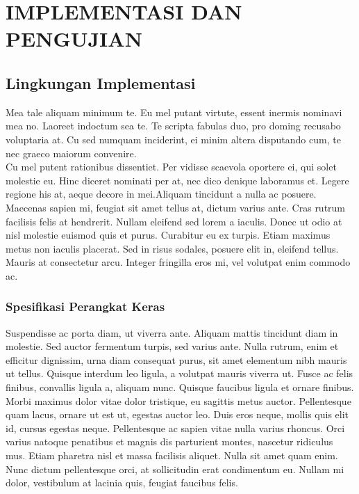 \chapter{IMPLEMENTASI DAN PENGUJIAN}

\vspace{4.5pt}

\section{Lingkungan Implementasi}
Mea tale aliquam minimum te. Eu mel putant virtute, essent inermis nominavi mea no. Laoreet indoctum sea te. Te scripta fabulas duo, pro doming recusabo voluptaria at. Cu sed numquam inciderint, ei minim altera disputando cum, te nec graeco maiorum convenire.\\
Cu mel putent rationibus dissentiet. Per vidisse scaevola oportere ei, qui solet molestie eu. Hinc diceret nominati per at, nec dico denique laboramus et. Legere regione his at, aeque decore in mei.Aliquam tincidunt a nulla ac posuere. Maecenas sapien mi, feugiat sit amet tellus at, dictum varius ante. Cras rutrum facilisis felis at hendrerit. Nullam eleifend sed lorem a iaculis. Donec ut odio at nisl molestie euismod quis et purus. Curabitur eu ex turpis. Etiam maximus metus non iaculis placerat. Sed in risus sodales, posuere elit in, eleifend tellus. Mauris at consectetur arcu. Integer fringilla eros mi, vel volutpat enim commodo ac.\\

\subsection{Spesifikasi Perangkat Keras}
Suspendisse ac porta diam, ut viverra ante. Aliquam mattis tincidunt diam in molestie. Sed auctor fermentum turpis, sed varius ante. Nulla rutrum, enim et efficitur dignissim, urna diam consequat purus, sit amet elementum nibh mauris ut tellus. Quisque interdum leo ligula, a volutpat mauris viverra ut. Fusce ac felis finibus, convallis ligula a, aliquam nunc. Quisque faucibus ligula et ornare finibus. Morbi maximus dolor vitae dolor tristique, eu sagittis metus auctor. Pellentesque quam lacus, ornare ut est ut, egestas auctor leo. Duis eros neque, mollis quis elit id, cursus egestas neque. Pellentesque ac sapien vitae nulla varius rhoncus. Orci varius natoque penatibus et magnis dis parturient montes, nascetur ridiculus mus. Etiam pharetra nisl et massa facilisis aliquet. Nulla sit amet quam enim. Nunc dictum pellentesque orci, at sollicitudin erat condimentum eu. Nullam mi dolor, vestibulum at lacinia quis, feugiat faucibus felis.\\

